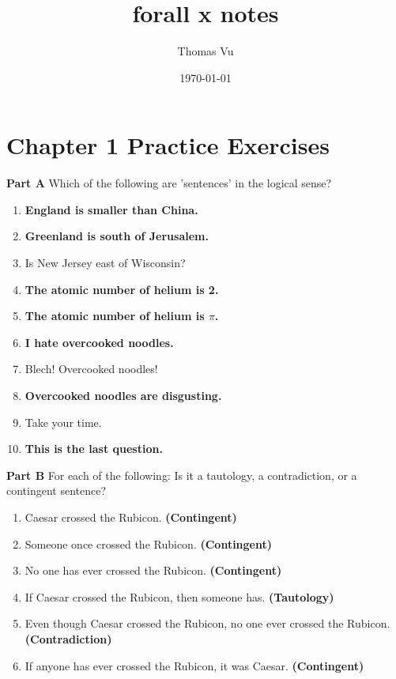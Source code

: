 \documentclass[12pt, letterpaper, twoside]{article}
\title{forall x notes}
\author{Thomas Vu}
\date{\today}
\begin{document}
\maketitle
\newpage
\tableofcontents
\newpage

\section{Chapter 1 Practice Exercises}
 
\textbf{Part A} Which of the following are 'sentences' in
the logical sense?
 
\begin{enumerate}
    \item \textbf{England is smaller than China.}
    \item \textbf{Greenland is south of Jerusalem.}
    \item Is New Jersey east of Wisconsin?
    \item \textbf{The atomic number of helium is 2.}
    \item \textbf{The atomic number of helium is $\pi$.}
    \item \textbf{I hate overcooked noodles.}
    \item Blech! Overcooked noodles!
    \item \textbf{Overcooked noodles are disgusting.}
    \item Take your time.
    \item \textbf{This is the last question.}
\end{enumerate}

\noindent \textbf{Part B} For each of the following: Is it a
tautology, a contradiction, or a contingent sentence?

\begin{enumerate}
    \item Caesar crossed the Rubicon. \textbf{(Contingent)}
    \item Someone once crossed the Rubicon. \textbf{(Contingent)}
    \item No one has ever crossed the Rubicon. \textbf{(Contingent)}
    \item If Caesar crossed the Rubicon, then someone
      has. \textbf{(Tautology)}
    \item Even though Caesar crossed the Rubicon, no one
      ever crossed the Rubicon. \textbf{(Contradiction)}
    \item If anyone has ever crossed the Rubicon, it was
      Caesar. \textbf{(Contingent)}
\end{enumerate}
\end{document}
